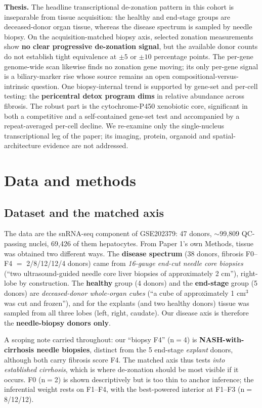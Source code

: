\documentclass[11pt,a4paper]{article}
\begin{document}
\textbf{Thesis.} The headline transcriptional de-zonation pattern in this cohort is inseparable from tissue acquisition: the healthy and end-stage groups are deceased-donor organ tissue, whereas the disease spectrum is sampled by needle biopsy. On the acquisition-matched biopsy axis, selected zonation measurements show \textbf{no clear progressive de-zonation signal}, but the available donor counts do not establish tight equivalence at $\pm5$ or $\pm10$ percentage points. The per-gene genome-wide scan likewise finds no zonation gene moving; its only per-gene signal is a biliary-marker rise whose source remains an open compositional-versus-intrinsic question. One biopsy-internal trend is supported by gene-set and per-cell testing: the \textbf{pericentral detox program dims} in relative abundance across fibrosis. The robust part is the cytochrome-P450 xenobiotic core, significant in both a competitive and a self-contained gene-set test and accompanied by a repeat-averaged per-cell decline. We re-examine only the single-nucleus transcriptional leg of the paper; its imaging, protein, organoid and spatial-architecture evidence are not addressed.

\section{Data and methods}

\subsection{Dataset and the matched axis}

The data are the snRNA-seq component of GSE202379: 47 donors, $\sim$99{,}809 QC-passing nuclei, 69{,}426 of them hepatocytes. From Paper 1's own Methods, tissue was obtained two different ways. The \textbf{disease spectrum} (38 donors, fibrosis F0--F4 $=$ 2/8/12/12/4 donors) came from \emph{16-gauge end-cut needle core biopsies} (``two ultrasound-guided needle core liver biopsies of approximately 2 cm''), right-lobe by construction. The \textbf{healthy} group (4 donors) and the \textbf{end-stage} group (5 donors) are \emph{deceased-donor whole-organ cubes} (``a cube of approximately 1 cm$^3$ was cut and frozen''), and for the explants (and two healthy donors) tissue was sampled from all three lobes (left, right, caudate). Our disease axis is therefore the \textbf{needle-biopsy donors only}.

A scoping note carried throughout: our ``biopsy F4'' (n$=$4) is \textbf{NASH-with-cirrhosis needle biopsies}, distinct from the 5 end-stage \emph{explant} donors, although both carry fibrosis score F4. The matched axis thus tests \emph{into established cirrhosis}, which is where de-zonation should be most visible if it occurs. F0 (n$=$2) is shown descriptively but is too thin to anchor inference; the inferential weight rests on F1--F4, with the best-powered interior at F1--F3 (n$=$8/12/12).
\end{document}
